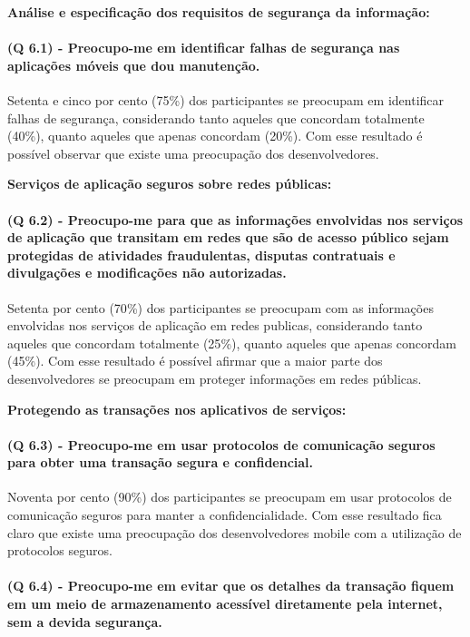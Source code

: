 \noindent\textbf{Análise e especificação dos requisitos de segurança da informação:}
\paragraph{\textbf{(Q 6.1)} - Preocupo-me em identificar falhas de segurança nas aplicações móveis que dou manutenção.}

Setenta e cinco por cento (75{\%}) dos participantes se preocupam em identificar falhas de segurança, considerando tanto aqueles que concordam totalmente (40{\%}), quanto aqueles que apenas concordam (20{\%}). Com esse resultado é possível observar que existe uma preocupação dos desenvolvedores.


\vspace{0.5cm}
\noindent\textbf{Serviços de aplicação seguros sobre redes públicas:}
\paragraph{\textbf{(Q 6.2)} - Preocupo-me para que as informações envolvidas nos serviços de aplicação que transitam em redes que são de acesso público sejam protegidas de atividades fraudulentas, disputas contratuais e divulgações e modificações não autorizadas.}

Setenta por cento (70{\%}) dos participantes se preocupam com as informações envolvidas nos serviços de aplicação em redes publicas, considerando tanto aqueles que concordam totalmente (25{\%}), quanto aqueles que apenas concordam (45{\%}). Com esse resultado é possível afirmar que a maior parte dos desenvolvedores se preocupam em proteger informações em redes públicas.

\vspace{0.5cm}
\noindent\textbf{Protegendo as transações nos aplicativos de serviços:}
\paragraph{\textbf{(Q 6.3)} - Preocupo-me em usar protocolos de comunicação seguros para obter uma transação segura e confidencial.}

Noventa por cento (90{\%}) dos participantes se preocupam em usar protocolos de comunicação seguros para manter a confidencialidade. Com esse resultado fica claro que existe uma preocupação dos desenvolvedores mobile com a utilização de protocolos seguros.

\paragraph{\textbf{(Q 6.4)} - Preocupo-me em evitar que os detalhes da transação fiquem em um meio de armazenamento acessível diretamente pela internet, sem a devida segurança.}

